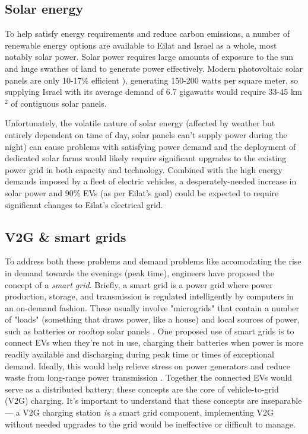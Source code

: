 \documentclass{report}                         %
\begin{document}
\subsection{Solar energy}
To help satisfy energy requirements and reduce carbon emissions, a number of renewable energy options are available to Eilat and Israel as a whole, most notably solar power. Solar power requires large amounts of exposure to the sun and huge swathes of land to generate power effectively. Modern photovoltaic solar panels are only 10-17\% efficient \cite{Zhu2015DistributedGrid}), generating 150-200 watts per square meter, so supplying Israel with its average demand of 6.7 gigawatts would require 33-45 km$^2$ of contiguous solar panels.

Unfortunately, the volatile nature of solar energy (affected by weather but entirely dependent on time of day, solar panels can't supply power during the night) can cause problems with satisfying power demand \cite{Lu2015IntroductionPEVs} and the deployment of dedicated solar farms would likely require significant upgrades to the existing power grid \cite{Vardimon2011AssessmentIsrael} in both capacity and technology. Combined with the high energy demands imposed by a fleet of electric vehicles, a desperately-needed increase in solar power and 90\% EVs (as per Eilat's goal) could be expected to require significant changes to Eilat's electrical grid.

\subsection{V2G \& smart grids}
To address both these problems and demand problems like accomodating the rise in demand towards the evenings (peak time), engineers have proposed the concept of a \textit{smart grid}. Briefly, a smart grid is a power grid where power production, storage, and transmission is regulated intelligently by computers in an on-demand fashion. These usually involve "microgrids" that contain a number of "loads" (something that draws power, like a house) and local sources of power, such as batteries or rooftop solar panels \cite{Lu2015IntroductionPEVs}. One proposed use of smart grids is to connect EVs when they're not in use, charging their batteries when power is more readily available and discharging during peak time \cite{Mahmud2015PowerEV} or times of exceptional demand. Ideally, this would help relieve stress on power generators and reduce waste from long-range power transmission \cite{Zhu2015DistributedGrid}. Together the connected EVs would serve as a distributed battery; these concepts are the core of vehicle-to-grid (V2G) charging. It's important to understand that these concepts are inseparable --- a V2G charging station \textit{is} a smart grid component, implementing V2G without needed upgrades to the grid would be ineffective or difficult to manage.
\end{document}
